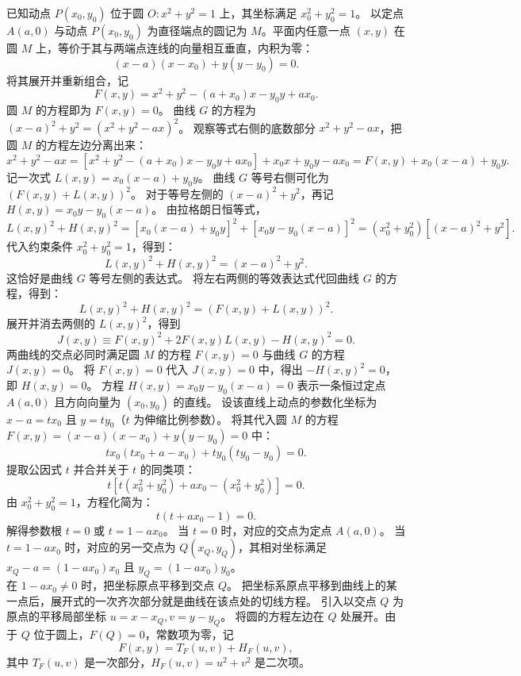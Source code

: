 \begin{solution}
已知动点 $P(x_0, y_0)$ 位于圆 $O: x^2 + y^2 = 1$ 上，其坐标满足 $x_0^2 + y_0^2 = 1$。
以定点 $A(a,0)$ 与动点 $P(x_0, y_0)$ 为直径端点的圆记为 $M$。平面内任意一点 $(x,y)$ 在圆 $M$ 上，等价于其与两端点连线的向量相互垂直，内积为零：
\[ (x - a)(x - x_0) + y(y - y_0) = 0. \]
将其展开并重新组合，记
\[ F(x,y) = x^2 + y^2 - (a + x_0)x - y_0 y + a x_0. \]
圆 $M$ 的方程即为 $F(x,y) = 0$。
曲线 $G$ 的方程为 $(x - a)^2 + y^2 = (x^2 + y^2 - ax)^2$。
观察等式右侧的底数部分 $x^2 + y^2 - ax$，把圆 $M$ 的方程左边分离出来：
\[ x^2 + y^2 - ax = \left[x^2 + y^2 - (a + x_0)x - y_0 y + a x_0\right] + x_0 x + y_0 y - a x_0 = F(x,y) + x_0(x - a) + y_0 y. \]
记一次式 $L(x,y) = x_0(x - a) + y_0 y$。
曲线 $G$ 等号右侧可化为 $(F(x,y) + L(x,y))^2$。
对于等号左侧的 $(x - a)^2 + y^2$，再记 $H(x,y) = x_0 y - y_0(x - a)$。
由拉格朗日恒等式，
\[ L(x,y)^2 + H(x,y)^2 = \left[x_0(x - a) + y_0 y\right]^2 + \left[x_0 y - y_0(x - a)\right]^2 = (x_0^2 + y_0^2)\left[(x - a)^2 + y^2\right]. \]
代入约束条件 $x_0^2 + y_0^2 = 1$，得到：
\[ L(x,y)^2 + H(x,y)^2 = (x - a)^2 + y^2. \]
这恰好是曲线 $G$ 等号左侧的表达式。
将左右两侧的等效表达式代回曲线 $G$ 的方程，得到：
\[ L(x,y)^2 + H(x,y)^2 = (F(x,y) + L(x,y))^2. \]
展开并消去两侧的 $L(x,y)^2$，得到
\[ J(x,y) \equiv F(x,y)^2 + 2F(x,y)L(x,y) - H(x,y)^2 = 0. \]
两曲线的交点必同时满足圆 $M$ 的方程 $F(x,y) = 0$ 与曲线 $G$ 的方程 $J(x,y) = 0$。
将 $F(x,y) = 0$ 代入 $J(x,y) = 0$ 中，得出 $-H(x,y)^2 = 0$，即 $H(x,y) = 0$。
方程 $H(x,y) = x_0 y - y_0(x - a) = 0$ 表示一条恒过定点 $A(a,0)$ 且方向向量为 $(x_0, y_0)$ 的直线。
设该直线上动点的参数化坐标为 $x - a = t x_0$ 且 $y = t y_0$（$t$ 为伸缩比例参数）。
将其代入圆 $M$ 的方程 $F(x,y) = (x - a)(x - x_0) + y(y - y_0) = 0$ 中：
\[ t x_0(t x_0 + a - x_0) + t y_0(t y_0 - y_0) = 0. \]
提取公因式 $t$ 并合并关于 $t$ 的同类项：
\[ t \left[ t(x_0^2 + y_0^2) + a x_0 - (x_0^2 + y_0^2) \right] = 0. \]
由 $x_0^2 + y_0^2 = 1$，方程化简为：
\[ t(t + a x_0 - 1) = 0. \]
解得参数根 $t = 0$ 或 $t = 1 - a x_0$。
当 $t = 0$ 时，对应的交点为定点 $A(a,0)$。
当 $t = 1 - a x_0$ 时，对应的另一交点为 $Q(x_Q, y_Q)$，其相对坐标满足 $x_Q - a = (1 - a x_0)x_0$ 且 $y_Q = (1 - a x_0)y_0$。\\
在 $1 - a x_0 \neq 0$ 时，把坐标原点平移到交点 $Q$。
把坐标系原点平移到曲线上的某一点后，展开式的一次齐次部分就是曲线在该点处的切线方程。
引入以交点 $Q$ 为原点的平移局部坐标 $u = x - x_Q, v = y - y_Q$。
将圆的方程左边在 $Q$ 处展开。由于 $Q$ 位于圆上，$F(Q) = 0$，常数项为零，记
\[
F(x,y) = T_F(u,v) + H_F(u,v),
\]
其中 $T_F(u,v)$ 是一次部分，$H_F(u,v) = u^2 + v^2$ 是二次项。

\end{solution}
